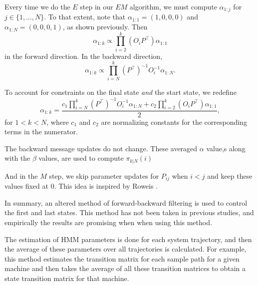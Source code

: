 \documentclass[english]{article}
\numberwithin{equation}{section}
\begin{document}
	Every time we do the $E$ step in our $EM$ algorithm, we must compute $\alpha_{1:j}$ for $j\in \{1,\ldots,N\}$. To that extent, note that $\alpha_{1:1}=(1,0,0,0)$ and $\alpha_{1:N}=(0,0,0,1)$, as shown previously. Then $$\alpha_{1:k}\propto \prod_{i=2}^k (O_{i}P^{\top})\alpha_{1:1}$$ in the forward direction. In the backward direction, $$\alpha_{1:k}\propto \prod_{i=N}^{k} (P^{\top})^{-1} O_{i}^{-1}\alpha_{1:N}.$$
	
	To account for constraints on the final state \textit{and} the start state, we redefine $$\alpha_{1:k} = \frac{c_1\prod_{i=N}^{k} (P^{\top})^{-1} O_{i}^{-1}\alpha_{1:N} + c_2\prod_{i=2}^k (O_{i}P^{\top})\alpha_{1:1}}{2},$$ for $1<k<N$, where $c_1$ and $c_2$ are normalizing constants for the corresponding terms in the numerator.
	
	The backward message updates do not change. These averaged $\alpha$ value,s along with the $\beta$ values, are used to compute $\pi_{k|N}(i)$
	
	And in the $M$ step, we skip parameter updates for $P_{ij}$ when $i<j$ and keep these values fixed at $0$. This idea is inspired by Roweis \cite{hmm}.
	
	
	
	In summary, an altered method of forward-backward filtering is used to control the first and last states. This method has not been taken in previous studies, and empirically the results are promising when when using this method.
	
	The estimation of HMM parameters is done for each system trajectory, and then the average of these parameters over all trajectories is calculated. For example, this method estimates the transition matrix for each sample path for a given machine and then takes the average of all these transition matrices to obtain a state transition matrix for that machine.
\end{document}
